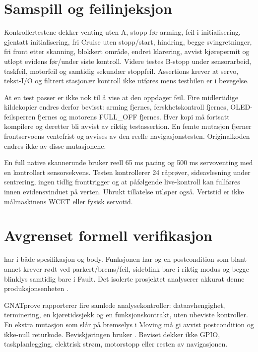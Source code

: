 \section{Samspill og feilinjeksjon}
Kontrollertestene dekker venting uten A, stopp før arming, feil i
initialisering, gjentatt initialisering, fri Cruise uten stopp/start,
hindring, begge svingretninger, fri front etter skanning, blokkert område,
endret klarering, avvist kjørepermit og utløpt evidens før/under siste
kontroll. Videre testes B-stopp under sensorarbeid, taskfeil, motorfeil
og samtidig sekundær stoppfeil. Assertions krever at servo, tekst-I/O og
filtrert stasjonær kontroll ikke utføres mens testbilen er i bevegelse.

At en test passer er ikke nok til å vise at den oppdager feil. Fire
midlertidige kildekopier endres derfor bevisst: arming fjernes,
ferskhetskontroll fjernes, OLED-feilsperren fjernes og motorens FULL\_OFF
fjernes. Hver kopi må fortsatt kompilere og deretter bli avvist av riktig
testassertion. En femte mutasjon fjerner frontservoens ventefrist og
avvises av den reelle navigasjonstesten. Originalkoden endres ikke av
disse mutasjonene.

En full native skannerunde bruker reell 65 ms pacing og 500 ms servoventing
med en kontrollert sensorsekvens. Testen kontrollerer 24 råprøver,
sideavlesning under sentrering, ingen tidlig fronttrigger og at påfølgende
live-kontroll kan fullføres innen evidensvinduet på verten. Ubrukt tillatelse
utløper også. Vertstid er ikke målmaskinens WCET eller fysisk servotid.

\section{Avgrenset formell verifikasjon}
 har  i både spesifikasjon og
body. Funksjonen  har  og en
postcondition som blant annet krever rødt ved parkert/brems/feil,
sideblink bare i riktig modus og begge blinklys samtidig bare i Fault.
Det isolerte prosjektet analyserer akkurat denne produksjonsenheten
\cite{sparktutorial2026}.

GNATprove rapporterer fire samlede analysekontroller: dataavhengighet,
terminering, en kjøretidssjekk og en funksjonskontrakt, uten ubeviste
kontroller. En ekstra mutasjon som slår på bremselys i Moving må gi
avvist postcondition og ikke-null returkode. Beviskjøringen bruker
. Beviset dekker ikke GPIO, taskplanlegging,
elektrisk strøm, motorstopp eller resten av navigasjonen.

